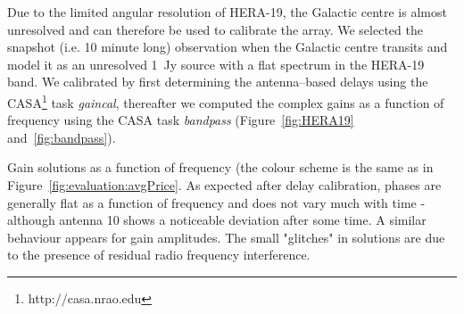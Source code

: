 \documentclass[a0,portrait]{a0poster}
\begin{document}
\begin{multicols}{2}
Due to the limited angular resolution of HERA-19, the Galactic centre is almost unresolved and can therefore be used to calibrate the array.
We selected the snapshot (i.e. 10 minute long) observation when the Galactic centre transits and model it as an unresolved 1~Jy source with a flat spectrum in the HERA-19 band. We calibrated by first determining the antenna--based delays using the CASA\footnote{http://casa.nrao.edu} task {\it gaincal}, thereafter we computed the complex gains as a function of frequency using the CASA task {\it bandpass} (Figure~\ref{fig:HERA19} and~\ref{fig:bandpass}).
%
\begin{minipage}{\columnwidth}
    \makeatletter
    \newcommand{\@captype}{figure}
    \makeatother
    \centering
    \qquad%
    \caption{Gain solutions as a function of frequency (the colour scheme is the same as in Figure~\ref{fig:evaluation:avgPrice}. As expected after delay calibration, phases are generally flat as a function of frequency and does not vary much with time - although antenna 10 shows a noticeable deviation after some time. A similar behaviour appears for gain amplitudes. The small "glitches" in solutions are due to the presence of residual radio frequency interference.}
\label{fig:bandpass}
  \end{minipage}


\end{multicols}
\end{document}
